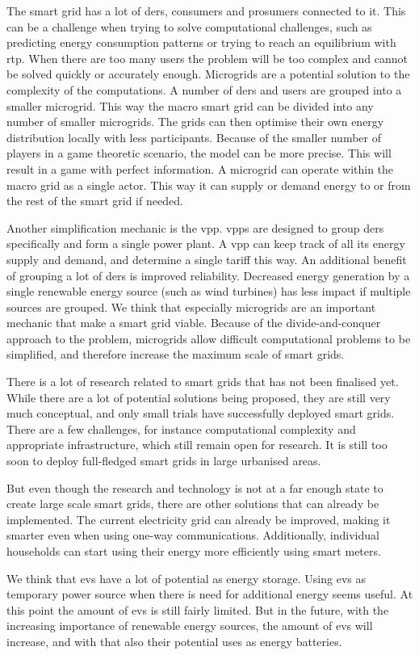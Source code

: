 The smart grid has a lot of \acp{der}, consumers and prosumers connected to it. This can be a challenge when trying to solve computational challenges, such as predicting energy consumption patterns or trying to reach an equilibrium with \ac{rtp}. When there are too many users the problem will be too complex and cannot be solved quickly or accurately enough. 
Microgrids are a potential solution to the complexity of the computations. A number of \acp{der} and users are grouped into a smaller microgrid. This way the macro smart grid can be divided into any number of smaller microgrids. The grids can then optimise their own energy distribution locally with less participants. Because of the smaller number of players in a game theoretic scenario, the model can be more precise. This will result in a game with perfect information. A microgrid can operate within the macro grid as a single actor. This way it can supply or demand energy to or from the rest of the smart grid if needed.

Another simplification mechanic is the \ac{vpp}. \acp{vpp} are designed to group \acp{der} specifically and form a single power plant. A \ac{vpp} can keep track of all its energy supply and demand, and determine a single tariff this way. An additional benefit of grouping a lot of \acp{der} is improved reliability. Decreased energy generation by a single renewable energy source (such as wind turbines) has less impact if multiple sources are grouped.
We think that especially microgrids are an important mechanic that make a smart grid viable. Because of the divide-and-conquer approach to the problem, microgrids allow difficult computational problems to be simplified, and therefore increase the maximum scale of smart grids.

There is a lot of research related to smart grids that has not been finalised yet. While there are a lot of potential solutions being proposed, they are still very much conceptual, and only small trials have successfully deployed smart grids. There are a few challenges, for instance computational complexity and appropriate infrastructure, which still remain open for research. It is still too soon to deploy full-fledged smart grids in large urbanised areas.

But even though the research and technology is not at a far enough state to create large scale smart grids, there are other solutions that can already be implemented. The current electricity grid can already be improved, making it smarter even when using one-way communications. Additionally, individual households can start using their energy more efficiently using smart meters. 

We think that \acp{ev} have a lot of potential as energy storage. Using \acp{ev} as temporary power source when there is need for additional energy seems useful. At this point the amount of \acp{ev} is still fairly limited. But in the future, with the increasing importance of renewable energy sources, the amount of \acp{ev} will increase, and with that also their potential uses as energy batteries. 